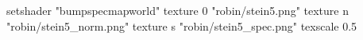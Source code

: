 setshader "bumpspecmapworld"
   texture 0 "robin/stein5.png"
   texture n "robin/stein5_norm.png"
   texture s "robin/stein5_spec.png"
texscale 0.5